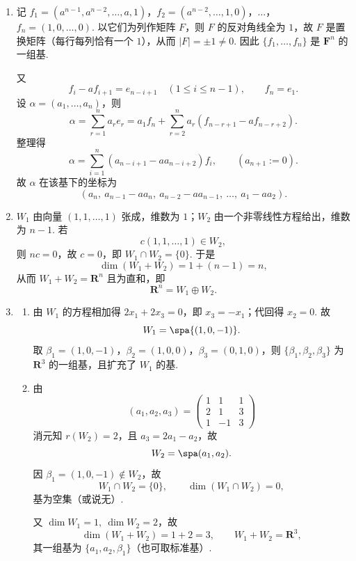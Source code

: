 \begin{enumerate}
    \item 记 $f_1=(a^{n-1},a^{n-2},\ldots,a,1)$，$f_2=(a^{n-2},\ldots,1,0)$，$\ldots$，$f_n=(1,0,\ldots,0)$. 以它们为列作矩阵 $F$，则 $F$ 的反对角线全为 $1$，故 $F$ 是置换矩阵（每行每列恰有一个 $1$），从而 $|F|=\pm 1\neq 0$. 因此 $\{f_1,\ldots,f_n\}$ 是 $\mathbf{F}^n$ 的一组基.

    又
    \[
        f_i-af_{i+1}=e_{n-i+1}\quad(1\leqslant i\leqslant n-1),
        \qquad f_n=e_1.
    \]
    设 $\alpha=(a_1,\ldots,a_n)$，则
    \[
        \alpha=\sum_{r=1}^na_re_r
        =a_1f_n+\sum_{r=2}^na_r(f_{n-r+1}-af_{n-r+2}).
    \]
    整理得
    \[
        \alpha=\sum_{i=1}^n\left(a_{n-i+1}-aa_{n-i+2}\right)f_i,
        \qquad (a_{n+1}:=0).
    \]
    故 $\alpha$ 在该基下的坐标为
    \[
        \left(a_n,\ a_{n-1}-aa_n,\ a_{n-2}-aa_{n-1},\ \ldots,\ a_1-aa_2\right).
    \]

    \item $W_1$ 由向量 $(1,1,\ldots,1)$ 张成，维数为 $1$；$W_2$ 由一个非零线性方程给出，维数为 $n-1$. 若
    \[
        c(1,1,\ldots,1)\in W_2,
    \]
    则 $nc=0$，故 $c=0$，即 $W_1\cap W_2=\{0\}$. 于是
    \[
        \dim(W_1+W_2)=1+(n-1)=n,
    \]
    从而 $W_1+W_2=\mathbf{R}^n$ 且为直和，即
    \[
        \mathbf{R}^n=W_1\oplus W_2.
    \]

    \item
    \begin{enumerate}
        \item 由 $W_1$ 的方程相加得 $2x_1+2x_3=0$，即 $x_3=-x_1$；代回得 $x_2=0$. 故
        \[
            W_1=\spa\{(1,0,-1)\}.
        \]
        取 $\beta_1=(1,0,-1)$，$\beta_2=(1,0,0)$，$\beta_3=(0,1,0)$，则 $\{\beta_1,\beta_2,\beta_3\}$ 为 $\mathbf{R}^3$ 的一组基，且扩充了 $W_1$ 的基.

        \item 由
        \[
            (a_1,a_2,a_3)=
            \begin{pmatrix}
                1&1&1\\
                2&1&3\\
                1&-1&3
            \end{pmatrix}
        \]
        消元知 $r(W_2)=2$，且 $a_3=2a_1-a_2$，故
        \[
            W_2=\spa(a_1,a_2).
        \]
        因 $\beta_1=(1,0,-1)\notin W_2$，故
        \[
            W_1\cap W_2=\{0\},\qquad \dim(W_1\cap W_2)=0,
        \]
        基为空集（或说无）.

        又 $\dim W_1=1,\ \dim W_2=2$，故
        \[
            \dim(W_1+W_2)=1+2=3,
            \qquad W_1+W_2=\mathbf{R}^3,
        \]
        其一组基为 $\{a_1,a_2,\beta_1\}$（也可取标准基）.
    \end{enumerate}


\end{enumerate}
